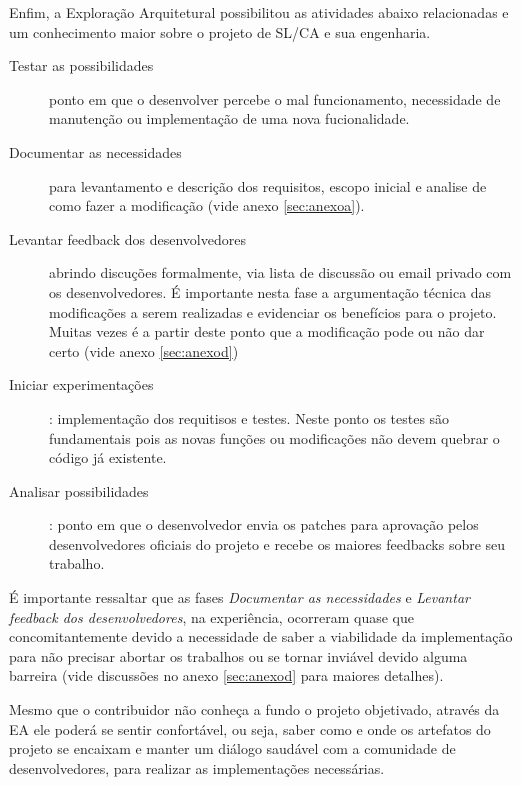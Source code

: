 Enfim, a Exploração Arquitetural possibilitou as atividades abaixo relacionadas e um conhecimento maior sobre o projeto de SL/CA e sua engenharia. 
\begin{description}
\item [Testar as possibilidades] ponto em que o desenvolver percebe o mal funcionamento, necessidade de manutenção ou implementação de uma nova fucionalidade.
\item [Documentar as necessidades] para levantamento e descrição dos requisitos, escopo inicial e analise de como fazer a modificação (vide anexo \ref{sec:anexoa}).
\item [Levantar feedback dos desenvolvedores] abrindo discuções formalmente, via lista de discussão ou email privado com os desenvolvedores. É importante nesta fase a argumentação técnica das modificações a serem realizadas e evidenciar os benefícios para o projeto. Muitas vezes é a partir deste ponto que a modificação pode ou não dar certo (vide anexo \ref{sec:anexod})
\item [Iniciar experimentações]: implementação dos requitisos e testes. Neste ponto os testes são fundamentais pois as novas funções ou modificações não devem quebrar o código já existente.
\item [Analisar possibilidades]: ponto em que o desenvolvedor envia os patches para aprovação pelos desenvolvedores oficiais do projeto e recebe os maiores feedbacks sobre seu trabalho.   \end{description}

É importante ressaltar que as fases \textit{Documentar as necessidades} e \textit{Levantar feedback dos desenvolvedores}, na experiência, ocorreram quase que concomitantemente devido a necessidade de saber a viabilidade da implementação para não precisar abortar os trabalhos ou se tornar inviável devido alguma barreira (vide discussões no anexo \ref{sec:anexod} para maiores detalhes).

Mesmo que o contribuidor não conheça a fundo o projeto objetivado, através da EA ele poderá se sentir confortável, ou seja, saber como e onde os artefatos do projeto se encaixam e manter um diálogo saudável com a comunidade de desenvolvedores, para realizar as implementações necessárias.

